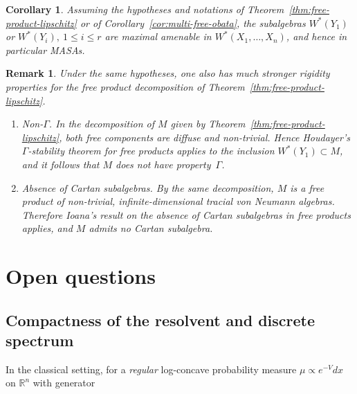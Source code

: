 \documentclass[10pt,a4paper,reqno]{amsart}
\newtheorem{corollary}[theorem]{Corollary}
\newtheorem{remark}[theorem]{Remark}
\begin{document}
\begin{corollary}
Assuming the hypotheses and notations of
Theorem~\ref{thm:free-product-lipschitz} or of
Corollary~\ref{cor:multi-free-obata}, the subalgebras $W^\ast(Y_1)$ or $W^\ast (Y_i),\:1\leq i\leq r$ are
maximal amenable in $W^\ast(X_1,\ldots,X_n)$, and hence in particular MASAs.
\end{corollary}





\begin{remark}
Under the same hypotheses, one also has much stronger rigidity properties
for the free product decomposition of Theorem~\ref{thm:free-product-lipschitz}.

\begin{enumerate}
  \item \emph{Non-$\Gamma$.}
  In the decomposition of $M$ given by Theorem~\ref{thm:free-product-lipschitz},
  both free components are diffuse and non-trivial.  Hence Houdayer’s
  $\Gamma$-stability theorem for free products \cite[Theorem~A]{Houdayer-Gamma}
  applies to the inclusion $W^\ast(Y_1)\subset M$, and it follows that $M$
  does not have property~$\Gamma$.

  \item \emph{Absence of Cartan subalgebras.}
  By the same decomposition, $M$ is a free product of non-trivial, infinite-dimensional
  tracial von Neumann algebras.  Therefore Ioana’s result on the absence
  of Cartan subalgebras in free products \cite[Corollary~1.5]{Ioana-Cartan-AFP}
  applies, and $M$ admits no Cartan subalgebra.
\end{enumerate}
\end{remark}











\section{Open questions}\label{Open}
\subsection{Compactness of the resolvent and discrete spectrum}

In the classical setting, for a \emph{regular}
log-concave probability measure
$\mu\propto e^{-V}dx$ on $\mathbb{R}^n$ with generator
\end{document}
